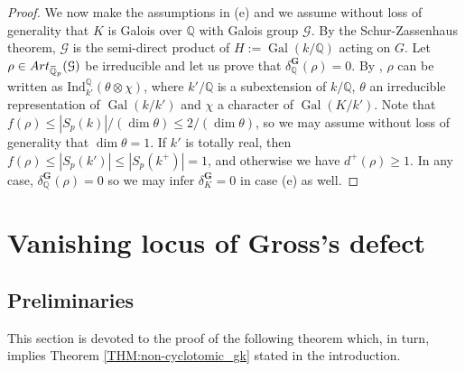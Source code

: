 \documentclass[12pt]{amsart}
\newcommand{\Q}{\mathbb{Q}}
\newcommand\bQ{\mathbb{Q}}
\newcommand\cG{\mathcal{G}}
\newcommand{\ob}[1]{\mkern 1.5mu\overline{\mkern-1.5mu#1\mkern-1.5mu}\mkern 1.5mu}
\newcommand{\Ind}{\mathrm{Ind}}
\newcommand{\Art}{\textrm{Art}}
\DeclareMathOperator{\Gal}{Gal}
\theoremstyle{defstyle}
\theoremstyle{thmstyle}
\begin{document}
\begin{proof}
		We now make the assumptions in (e) and we assume without loss of generality that $K$ is Galois over $\Q$ with Galois group $\cG$. By the Schur-Zassenhaus theorem, $\cG$ is the semi-direct product of $H:=\Gal(k/\Q)$ acting on $G$. Let $\rho\in \Art_{\ob{\bQ}_p}(\cG)$ be irreducible and let us prove that $\delta_\Q^\textbf{G}(\rho)=0$.
		By \cite[Chap II \S~8.2]{serrerepresentations}, $\rho$ can be written as $\Ind_{k'}^{\Q} (\theta\otimes\chi)$, where $k'/\Q$ is a subextension of $k/\Q$, $\theta$ an irreducible representation of $\Gal(k/k')$ and $\chi$ a character of $\Gal(K/k')$. Note that $f(\rho)\leq |S_p(k)|/(\dim\theta)\leq 2/(\dim\theta)$, so we may assume without loss of generality that $\dim \theta=1$.
		If $k'$ is totally real, then $f(\rho)\leq |S_p(k')|\leq|S_p(k^+)|=1$, and otherwise we have $d^+(\rho)\geq 1$. In any case, $\delta_\Q^\textbf{G}(\rho)=0$ so we may infer $\delta_K^\textbf{G}=0$ in case (e) as well.
	\end{proof}
	
	\section{Vanishing locus of Gross's defect}\label{sec:vanishing_locus}
	\subsection{Preliminaries}
	This section is devoted to the proof of the following theorem which, in turn, implies Theorem \ref{THM:non-cyclotomic_gk} stated in the introduction. 
	
\end{document}
